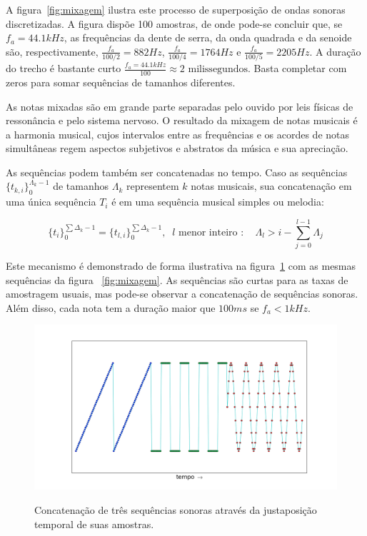 A figura~\ref{fig:mixagem} ilustra este processo de superposição de ondas sonoras discretizadas. A figura dispõe 100 amostras, de onde pode-se concluir que, se $f_a=44.1kHz$, as frequências da dente de serra, da onda quadrada e da senoide são,
respectivamente, $\frac{f_a}{100/2}=882Hz$, $\frac{f_a}{100/4}=1764Hz$ e $\frac{f_a}{100/5}=2205Hz$. A duração do trecho é bastante curto $\frac{f_a=44.1kHz}{100} \approx 2 \text{ milissegundos}$. Basta completar com zeros para somar sequências de tamanhos diferentes. 

As notas mixadas são em grande parte separadas pelo ouvido por leis físicas de ressonância e pelo sistema nervoso.\cite{Roederer} O resultado da mixagem de notas musicais é a harmonia musical, cujos intervalos entre as frequências e os acordes de notas simultâneas regem aspectos subjetivos e abstratos da música e sua apreciação.\cite{Harmonia} 

As sequências podem também ser concatenadas no tempo. Caso as sequências $\{t_{k,i}\}_0^{\Lambda_k-1}$ de tamanhos $\Lambda_k$  representem $k$ notas musicais, sua concatenação em uma única sequência $T_i$ é em uma sequência musical simples ou melodia:

\begin{equation}\label{eq:concatenacao}
\{t_i\}_0^{\sum\Delta_k-1}=\{t_{l,i}\}_0^{\sum\Delta_k-1}, \;\; l\text{ menor inteiro } : \quad \Lambda_l > i -\sum_{j=0}^{l-1}\Lambda_j
\end{equation}

Este mecanismo é demonstrado de forma ilustrativa na figura~\ref{fig:concatenacao} com as mesmas sequências da figura ~\ref{fig:mixagem}.
 As sequências são curtas para as taxas de amostragem usuais, mas pode-se observar a concatenação de sequências sonoras. Além disso, cada nota tem a duração maior que $100ms$ se $f_a<1kHz$.

\begin{figure}[h!]
{    \centering
        \includegraphics[width=\textwidth]{figuras/concatenacao}}
    \caption{Concatenação de três sequências sonoras através da justaposição temporal de suas amostras.}
        \label{fig:concatenacao}
\end{figure}

